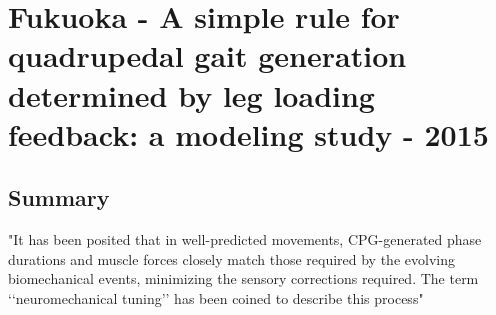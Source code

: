\section{Fukuoka - A simple rule for quadrupedal gait generation determined by leg loading feedback: a modeling study - 2015}

\subsection*{Summary}

 "It has been posited that in well-predicted movements, CPG-generated phase durations and muscle forces closely match those required by the evolving biomechanical events, minimizing the sensory corrections required. The term ‘‘neuromechanical tuning’’ has been coined to describe this process"